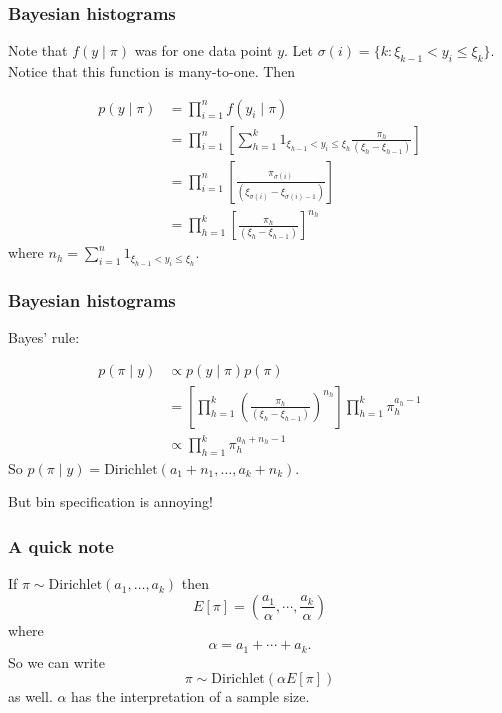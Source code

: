 \documentclass{beamer}
\begin{document}
\begin{frame}
\frametitle{Bayesian histograms}

Note that $f(y \mid \pi)$ was for one data point $y$. Let $\sigma(i) = \{k : \xi_{k-1} < y_i \le \xi_{k} \}$. Notice that this function is many-to-one. Then

\begin{align*}
p(y \mid \pi)  &= \prod_{i=1}^n f(y_i \mid \pi) \\
&= \prod_{i=1}^n\left[ \sum_{h=1}^k 1_{\xi_{h-1} < y_i \le \xi_{h} } \frac{\pi_h}{(\xi_{h} - \xi_{h-1})} \right] \\
&= \prod_{i=1}^n\left[  \frac{\pi_{\sigma(i)} }{(\xi_{\sigma(i)} - \xi_{\sigma(i)-1}  )} \right] \\
&= \prod_{h=1}^k \left[  \frac{\pi_{h} }{(\xi_{h} - \xi_{h-1}  )} \right] ^{n_h}
\end{align*}  
where $n_h = \sum_{i=1}^n 1_{\xi_{h-1} < y_i \le \xi_{h} }$.
\end{frame}

\begin{frame}
\frametitle{Bayesian histograms}

Bayes' rule:

\begin{align*}
p(\pi \mid y) &\propto p(y \mid \pi) p(\pi) \\
&= \left[\prod_{h=1}^k   \left(\frac{\pi_{h} }{(\xi_{h} - \xi_{h-1}  )}\right)  ^{n_h} \right]\prod_{h=1}^k \pi_h^{a_h-1} \\
&\propto \prod_{h=1}^k \pi_h^{a_h+n_h-1}
\end{align*}
So $p(\pi \mid y) = \text{Dirichlet}(a_1 + n_1, \ldots, a_k + n_k)$.
\pause
\newline

But bin specification is annoying!
\end{frame}

\begin{frame}
\frametitle{A quick note}

If $\pi \sim \text{Dirichlet}(a_1, \ldots, a_k)$ then
$$
E[\pi] = \left(\frac{a_1}{\alpha}, \cdots, \frac{a_k}{\alpha} \right)
$$
where 
$$
\alpha = a_1 + \cdots + a_k.
$$
So we can write 
$$
\pi \sim \text{Dirichlet}(\alpha E[\pi])
$$
as well. $\alpha$ has the interpretation of a sample size.

\end{frame}
\end{document}
